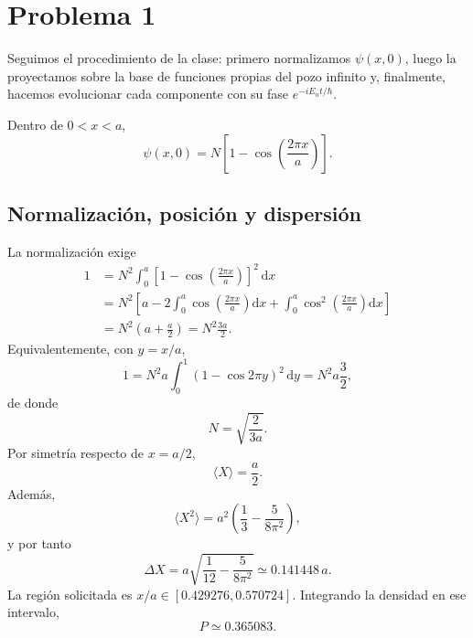 \documentclass[11pt,a4paper]{article}
\numberwithin{equation}{section}
\renewcommand{\boxed}[1]{#1}
\newcommand{\dd}{\,\mathrm d}
\begin{document}
\section{Problema 1}
Seguimos el procedimiento de la clase: primero normalizamos $\psi(x,0)$, luego la proyectamos sobre la base de funciones propias del pozo infinito y, finalmente, hacemos evolucionar cada componente con su fase $e^{-iE_nt/\hbar}$.

Dentro de $0<x<a$,
\begin{equation}
\psi(x,0)=N\left[1-\cos\left(\frac{2\pi x}{a}\right)\right].
\end{equation}

\subsection{Normalización, posición y dispersión}
La normalización exige
\begin{align}
1&=N^2\int_0^a\left[1-\cos\left(\frac{2\pi x}{a}\right)\right]^2\,\mathrm dx\\
&=N^2\left[a-2\int_0^a\cos\left(\frac{2\pi x}{a}\right)\mathrm dx
+\int_0^a\cos^2\left(\frac{2\pi x}{a}\right)\mathrm dx\right]\\
&=N^2\left(a+\frac a2\right)=N^2\frac{3a}{2}.
\end{align}
Equivalentemente, con $y=x/a$,
\begin{equation}
1=N^2a\int_0^1(1-\cos2\pi y)^2\dd y=N^2a\frac32,
\end{equation}
de donde
\begin{equation}
\boxed{N=\sqrt{\frac{2}{3a}}.}
\end{equation}
Por simetría respecto de $x=a/2$,
\begin{equation}
\boxed{\langle X\rangle=\frac a2.}
\end{equation}
Además,
\begin{equation}
\langle X^2\rangle=a^2\left(\frac13-\frac{5}{8\pi^2}\right),
\end{equation}
y por tanto
\begin{equation}
\boxed{\Delta X=a\sqrt{\frac1{12}-\frac{5}{8\pi^2}}
\simeq0.141448\,a.}
\end{equation}
La región solicitada es $x/a\in[0.429276,0.570724]$. Integrando la densidad en ese intervalo,
\begin{equation}
\boxed{P\simeq0.365083.}
\end{equation}
\end{document}
